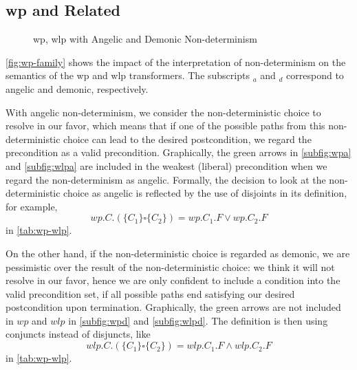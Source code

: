 \subsection{wp and Related}
\begin{figure}[ht]\centering
	\hfill

	\hfill
	\caption{wp, wlp with Angelic and Demonic Non-determinism}
	\label{fig:wp-family}
\end{figure}
\autoref{fig:wp-family} shows the impact of the interpretation of non-determinism on the semantics of the wp and wlp transformers. 
The subscripts $_a$ and $_d$ correspond to angelic and demonic, respectively. 

With angelic non-determinism, we consider the non-deterministic choice to resolve in our favor, which means that if one of the possible paths from this non-deterministic choice can lead to the desired postcondition, we regard the precondition as a valid precondition. 
Graphically, the green arrows in \autoref{subfig:wpa} and \autoref{subfig:wlpa} are included in the weakest (liberal) precondition when we regard the non-determinism as angelic. 
Formally, the decision to look at the non-deterministic choice as angelic is reflected by the use of disjoints in its definition, for example, 
$$wp.C.(\{C_1\}\square \{C_2\}) = wp.C_1.F\vee wp.C_2.F$$ in \autoref{tab:wp-wlp}.

On the other hand, if the non-deterministic choice is regarded as demonic, we are pessimistic over the result of the non-deterministic choice: we think it will not resolve in our favor, hence we are only confident to include a condition into the valid precondition set, if all possible paths end satisfying our desired postcondition upon termination. 
Graphically, the green arrows are not included in $wp$ and $wlp$ in \autoref{subfig:wpd} and \autoref{subfig:wlpd}. 
The definition is then using conjuncts instead of disjuncts, like 
$$wlp.C.(\{C_1\}\square \{C_2\}) = wlp.C_1.F\wedge wlp.C_2.F$$  in \autoref{tab:wp-wlp}.

